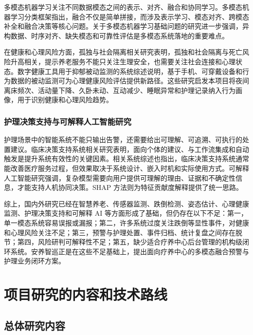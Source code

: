 \documentclass[UTF8,a4paper,zihao=-4,fontset=fandol]{ctexart}
\begin{document}
多模态机器学习关注不同数据模态之间的表示、对齐、融合和协同学习。多模态机器学习分类框架指出，融合不仅是简单拼接，而涉及表示学习、模态对齐、跨模态补全和融合决策等核心问题\cite{baltrusaitis2019multimodal}。关于多模态机器学习基础问题的研究进一步强调，异构数据、时序对齐、缺失模态和可靠性评估是多模态系统落地的重要难点\cite{liang2022foundations}。

在健康和心理风险方面，孤独与社会隔离相关研究表明，孤独和社会隔离与死亡风险升高相关，提示养老服务不能只关注生理安全，也需要关注社会连接和心理状态\cite{holtlunstad2015loneliness}。数字健康工具用于抑郁被动监测的系统综述说明，基于手机、可穿戴设备和行为数据的被动监测可为心理健康风险评估提供新路径\cite{sequeira2021digital}。这些研究启发本项目将夜间离床频次、活动量下降、久卧未动、互动减少、睡眠异常和护理记录纳入行为画像，用于识别健康和心理风险趋势。

\subsubsection{护理决策支持与可解释人工智能研究}

护理场景中的智能系统不能只输出告警，还需要给出可理解、可追溯、可执行的处置建议。临床决策支持系统相关研究表明，面向个体的建议、与工作流集成和自动触发是提升系统有效性的关键因素\cite{kawamoto2005cdss}。相关系统综述也指出，临床决策支持系统通常能改善医疗服务过程，但效果取决于系统设计、嵌入时机和实际使用方式\cite{bright2012cdss}。可解释人工智能研究强调，复杂模型需要向用户提供可理解的理由、证据和不确定性信息，才能支持人机协同决策\cite{gunning2019xai}。SHAP 方法则为特征贡献度解释提供了统一思路\cite{lundberg2017shap}。

综上，国内外研究已经在智慧养老、传感器监测、跌倒检测、姿态估计、心理健康监测、护理决策支持和可解释 AI 等方面形成了基础，但仍存在以下不足：第一，单一模态系统容易误报或漏报；第二，许多系统过度关注跌倒等显性事件，对健康和心理风险关注不足；第三，预警与护理处置、事件归档、统计复盘之间存在脱节；第四，风险研判可解释性不足；第五，缺少适合疗养中心后台管理的机构级闭环系统。安养智巡正是在这些不足基础上，提出面向疗养中心的多模态融合预警与护理业务闭环方案。

\section{项目研究的内容和技术路线}

\subsection{总体研究内容}
\end{document}
